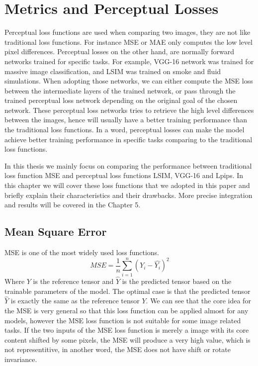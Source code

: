 \documentclass[a4paper,12pt,twoside]{report}
\begin{document}

\chapter{Metrics and Perceptual Losses}
Perceptual loss functions are used when comparing two images, they are not like traditional loss functions. For instance MSE or MAE only computes the low level pixel differences. Perceptual losses on the other hand, are normally forward networks trained for specific tasks. For example, VGG-16 network was trained for massive image classification, and LSIM was trained on smoke and fluid simulations. When adopting those networks, we can either compute the MSE loss between the intermediate layers of the trained network, or pass through the trained perceptual loss network depending on the original goal of the chosen network. These perceptual loss networks tries to retrieve the high level differences between the images, hence will usually have a better training performance than the traditional loss functions. In a word, perceptual losses can make the model achieve better training performance in specific tasks comparing to the traditional loss functions. 

In this thesis we mainly focus on comparing the performance between traditional loss function MSE and perceptual loss functions LSIM, VGG-16 and Lpips. In this chapter we will cover these loss functions that we adopted in this paper and briefly explain their characteristics and their drawbacks. More precise integration and results will be covered in the Chapter 5. 

\section{Mean Square Error}

MSE is one of the most widely used loss functions.
\begin{equation}
{MSE}=\frac{1}{n}\sum_{i=1}^n(Y_i-\hat{Y_i})^2
\end{equation}
Where ${Y}$ is the reference tensor and $\hat{Y}$ is the predicted tensor based on the trainable parameters of the model. The optimal case is that the predicted tensor $\hat{Y}$ is exactly the same as the reference tensor ${Y}$. We can see that the core idea for the MSE is very general so that this loss function can be applied almost for any models, however the MSE loss function is not suitable for some image related tasks. If the two inputs of the MSE loss function is merely a image with its core content shifted by some pixels, the MSE will produce a very high value, which is not representitive, in another word, the MSE does not have shift or rotate invariance. 
\end{document}
